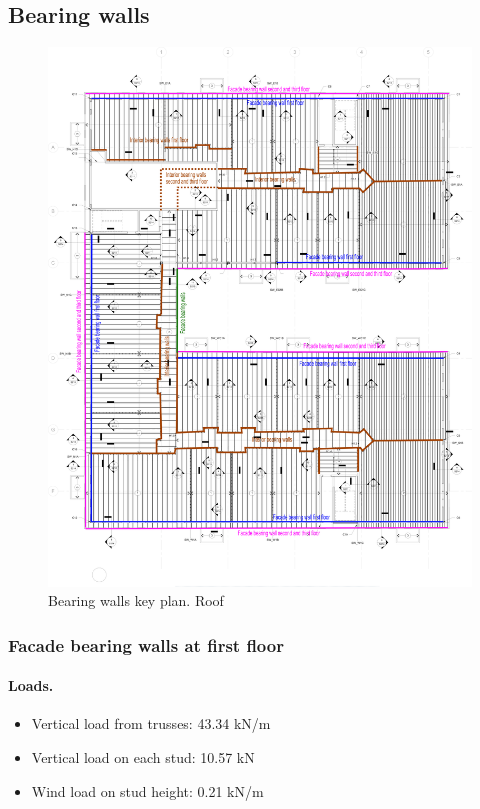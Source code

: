 \subsection{Bearing walls}

\begin{figure}
  \begin{center}
  \includegraphics[width=120mm]{figures/bearing_walls_key_plan}
  \end{center}
  \caption{Bearing walls key plan. Roof}\label{fg_bearing_walls_key_plan}
\end{figure}

\subsubsection{Facade bearing walls at first floor}

\paragraph{Loads.}

\begin{itemize}
\item Vertical load from trusses: 43.34 kN/m
\item Vertical load on each stud: 10.57 kN
\item Wind load on stud height: 0.21 kN/m
\end{itemize}

